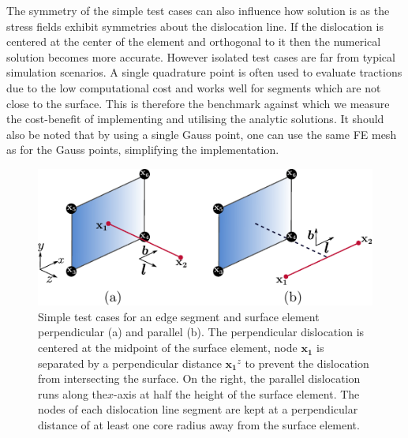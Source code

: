 \documentclass[11pt]{iopart}
\begin{document}
The symmetry of the simple test cases can also influence how solution is as the stress fields exhibit symmetries about the dislocation line. If the dislocation is centered at the center of the element and orthogonal to it then the numerical solution becomes more accurate. However isolated test cases are far from typical simulation scenarios. A single quadrature point is often used to evaluate tractions due to the low computational cost and works well for segments which are not close to the surface. This is therefore the benchmark against which we measure the cost-benefit of implementing and utilising the analytic solutions. It should also be noted that by using a single Gauss point, one can use the same FE mesh as for the Gauss points, simplifying the implementation.
%		
\begin{figure}
    \centering
    \includegraphics[width=0.8\linewidth]{images/test_gauss_quad.pdf}
    \caption{Simple test cases for an edge segment and surface element perpendicular (a) and parallel (b). The perpendicular dislocation is centered at the midpoint of the surface element, node $\mathbf{x_1}$ is separated by a perpendicular distance $\mathbf{x_1}^z$ to prevent the dislocation from intersecting the surface. On the right, the parallel dislocation runs along the$x$-axis at half the height of the surface element. The nodes of each dislocation line segment are kept at a perpendicular distance of at least one core radius away from the surface element.}
    \label{f:gauss_quad_test}
\end{figure}
\end{document}
